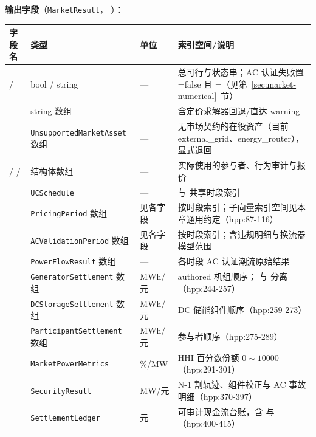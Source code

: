 \textbf{输出字段}（\texttt{MarketResult}，
）：
\begin{center}\footnotesize
\begin{longtable}{@{}L{4.6cm}L{3.4cm}L{1.7cm}L{5.6cm}@{}}
\toprule 字段名 & 类型 & 单位 & 索引空间/说明\\\midrule
\endhead
{} /  & bool / string & — & 总可行与状态串；AC 认证失败置 =false 且 =（见第~\ref{sec:market-numerical}~节）\\
 & string 数组 & — & 含定价求解器回退/直达 warning\\
 & \texttt{Unsupported\allowbreak Market\allowbreak Asset} 数组 & — & 无市场契约的在役资产（目前 external\_grid、energy\_router），显式退回\\
 /  /  & 结构体数组 & — & 实际使用的参与者、行为审计与报价\\
 & \texttt{UCSchedule} & — & 与  共享时段索引\\
 & \texttt{PricingPeriod} 数组 & 见各字段 & 按时段索引；子向量索引空间见本章通用约定（hpp:87-116）\\
 & \texttt{ACValidationPeriod} 数组 & 见各字段 & 按时段索引；含违规明细与换流器模型范围\\
 & \texttt{PowerFlowResult} 数组 & — & 各时段 AC 认证潮流原始结果\\
 & \texttt{GeneratorSettlement} 数组 & MWh/元 & authored 机组顺序； 与  分离（hpp:244-257）\\
 & \texttt{DCStorageSettlement} 数组 & MWh/元 & DC 储能组件顺序（hpp:259-273）\\
 & \texttt{Participant\allowbreak Settlement} 数组 & MWh/元 & 参与者顺序（hpp:275-289）\\
 & \texttt{MarketPowerMetrics} & \%/MW & HHI 百分数份额 $0\sim10000$（hpp:291-301）\\
 & \texttt{SecurityResult} & MW/元 & N-1 割轨迹、组件校正与 AC 事故明细（hpp:370-397）\\
 & \texttt{SettlementLedger} & 元 & 可审计现金流台账，含  与 （hpp:400-415）\\

\end{longtable}
\end{center}
